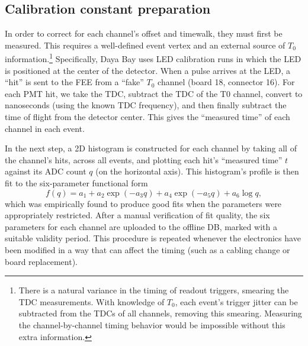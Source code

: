 \documentclass[../thesis.tex]{subfiles}
\begin{document}
\subsection{Calibration constant preparation}

In order to correct for each channel's offset and timewalk, they must first be measured. This requires a well-defined event vertex and an external source of $T_0$ information.\footnote{There is a natural variance in the timing of readout triggers, smearing the TDC measurements. With knowledge of $T_0$, each event's trigger jitter can be subtracted from the TDCs of all channels, removing this smearing. Measuring the channel-by-channel timing behavior would be impossible without this extra information.} Specifically, Daya Bay uses LED calibration runs in which the LED is positioned at the center of the detector. When a pulse arrives at the LED, a ``hit'' is sent to the FEE from a ``fake'' $T_0$ channel (board 18, connector 16). For each PMT hit, we take the TDC, subtract the TDC of the T0 channel, convert to nanoseconds (using the known TDC frequency), and then finally subtract the time of flight from the detector center. This gives the ``measured time'' of each channel in each event.

In the next step, a 2D histogram is constructed for each channel by taking all of the channel's hits, across all events, and plotting each hit's ``measured time'' $t$ against its ADC count $q$ (on the horizontal axis). This histogram's profile is then fit to the six-parameter functional form
\[ f(q) = a_1 + a_2 \exp (-a_3 q) + a_4 \exp (-a_5 q) + a_6 \log q, \] 
which was empirically found to produce good fits when the parameters were appropriately restricted. After a manual verification of fit quality, the six parameters for each channel are uploaded to the offline DB, marked with a suitable validity period. This procedure is repeated whenever the electronics have been modified in a way that can affect the timing (such as a cabling change or board replacement).

\begin{comment}
Show the tof-corrected times; comment on TDC discretization. Also, what about
the global offset adjustment? (It's in the DB filler script?) And the fact that
TDC values must be negated.
\end{comment}
\end{document}
